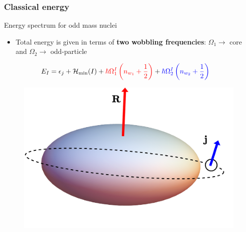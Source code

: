 \documentclass{beamer}
\begin{document}
\begin{frame}
  \frametitle{Classical energy}
      \begin{block}{Energy spectrum for odd mass nuclei}
        \begin{itemize}
          \item Total energy is given in terms of \textbf{two wobbling frequencies}: $\Omega_1\to$ {\color{red}core} and $\Omega_2\to$ {\color{blue}odd-particle}
        \end{itemize}
        \begin{align}
          E_I&={\color{black}\epsilon_{j}}+{\color{black}\mathcal{H}_\text{min}(I)}+{\color{red}\hbar\Omega_1^I\left(n_{w_1}+\frac{1}{2}\right)}+{\color{blue}\hbar\Omega_2^I\left(n_{w_2}+\frac{1}{2}\right)}\nonumber
        \end{align} 
      \end{block}
  \begin{figure}
    \centering
    \includegraphics[scale=0.23]{Figs/triaxial-shapes-oddA.pdf}
  \end{figure}
\end{frame}
\end{document}
